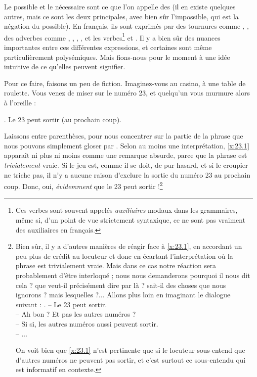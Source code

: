 Le possible et le nécessaire sont ce que l'on appelle des  (il en existe quelques autres, mais ce sont les deux principales, avec bien sûr l'impossible, qui est la négation du possible). 
En français, ils sont exprimés par des tournures comme , , des adverbes comme , , , , et les verbes\footnote{Ces verbes sont souvent appelés \emph{auxiliaires} modaux dans les grammaires, même si, d'un point de vue strictement syntaxique, ce ne sont pas vraiment des auxiliaires en français.}  et . 
Il y a bien sûr des nuances importantes entre ces différentes expressions, et certaines sont même particulièrement polysémiques. Mais fions-nous pour le moment à une idée intuitive de ce qu'elles peuvent signifier.


Pour ce faire, faisons un peu de fiction.
Imaginez-vous au casino, à une table de
roulette.  Vous venez de miser sur le numéro 23, et quelqu'un vous
murmure alors à l'oreille :

\ex.  \label{x:23.1}
Le 23 peut sortir (au prochain coup).


Laissons  entre parenthèses, pour nous
concentrer sur la partie de la phrase que nous pouvons simplement gloser par
.  Selon au moins une interprétation, \ref{x:23.1} apparaît ni
plus ni moins comme une remarque absurde, parce que la phrase est
\emph{trivialement} vraie.  Si le jeu est, comme il se doit, de pur
hasard, et si le croupier ne triche pas, il n'y a aucune raison
d'exclure la sortie du numéro 23 au prochain coup.
Donc, oui, \emph{évidemment} que le 23 peut sortir !\footnote{Bien sûr, il y a d'autres manières de réagir face à \ref{x:23.1}, en accordant un peu plus de crédit au locuteur et donc en écartant l'interprétation où la phrase est trivialement vraie. Mais dans ce cas notre réaction sera probablement d'être interloqué ; nous nous demanderons pourquoi il nous dit cela ? que veut-il précisément dire par là ? sait-il des choses que nous ignorons ? mais lesquelles ?... Allons plus loin en imaginant le dialogue suivant :\ExNBP
\ex.
-- Le 23 peut sortir.\\
-- Ah bon ? Et pas les autres numéros ?\\
-- Si si, les autres numéros aussi peuvent sortir.\\
-- ...

On voit bien que \ref{x:23.1} n'est pertinente que si le locuteur sous-entend que d'autres numéros ne peuvent pas sortir, et c'est surtout ce sous-entendu qui est informatif en contexte.%
}

